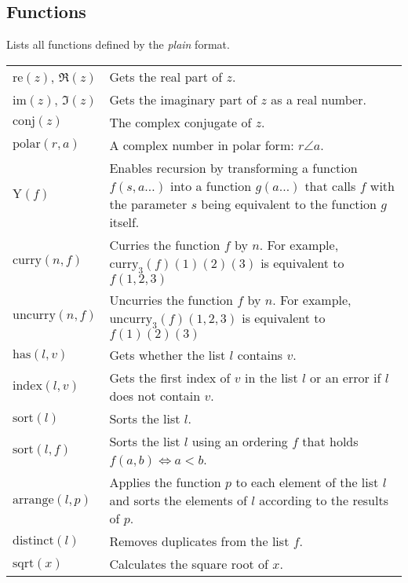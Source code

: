 \documentclass[10pt]{article}
\newcommand{\tabgap}{\vspace{3mm}\\}
\begin{document}
    \subsection{Functions}
    Lists all functions defined by the \textit{plain} format.
    \begin{longtable}{p{}p{}}
        $ \mathrm{re}(z) $, $ \Re(z) $             & Gets the real part of $ z $. \\
        $ \mathrm{im}(z) $, $ \Im(z) $             & Gets the imaginary part of $ z $ as a real number. \\
        $ \mathrm{conj}(z) $                       & The complex conjugate of $ z $. \\
        $ \mathrm{polar}(r, a) $                   & A complex number in polar form: $ r \angle a $. \tabgap
        $ \mathrm{Y}(f) $                          & Enables recursion by transforming a function $ f(s,a\dots) $ into a function $ g(a\dots) $ that calls $ f $ with the parameter $ s $ being equivalent to the function $ g $ itself. \\
        $ \mathrm{curry}(n, f) $                   & Curries the function $ f $ by $ n $. For example, $ \mathrm{curry}_3(f)(1)(2)(3) $ is equivalent to $ f(1,2,3) $ \\
        $ \mathrm{uncurry}(n, f) $                 & Uncurries the function $ f $ by $ n $. For example, $ \mathrm{uncurry}_3(f)(1,2,3) $ is equivalent to $ f(1)(2)(3) $ \tabgap
        $ \mathrm{has}(l, v) $                     & Gets whether the list $ l $ contains $ v $. \\
        $ \mathrm{index}(l, v) $                   & Gets the first index of $ v $ in the list $ l $ or an error if $ l $ does not contain $ v $. \\
        $ \mathrm{sort}(l) $                       & Sorts the list $ l $. \\
        $ \mathrm{sort}(l, f) $                    & Sorts the list $ l $ using an ordering $ f $ that holds $ f(a, b) \iff a < b $. \\
        $ \mathrm{arrange}(l, p) $                 & Applies the function $ p $ to each element of the list $ l $ and sorts the elements of $ l $ according to the results of $ p $. \\
        $ \mathrm{distinct}(l) $                   & Removes duplicates from the list $ f $. \tabgap
        $ \mathrm{sqrt}(x) $                       & Calculates the square root of $ x $. \\

\end{longtable}
\end{document}
